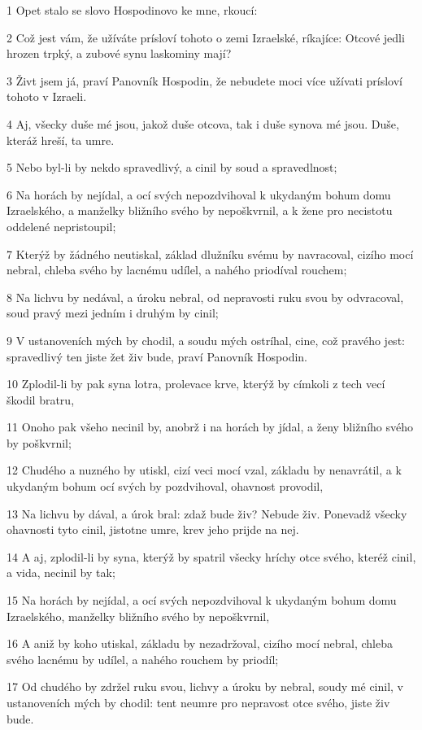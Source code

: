 \par 1 Opet stalo se slovo Hospodinovo ke mne, rkoucí:
\par 2 Což jest vám, že užíváte prísloví tohoto o zemi Izraelské, ríkajíce: Otcové jedli hrozen trpký, a zubové synu laskominy mají?
\par 3 Živt jsem já, praví Panovník Hospodin, že nebudete moci více užívati prísloví tohoto v Izraeli.
\par 4 Aj, všecky duše mé jsou, jakož duše otcova, tak i duše synova mé jsou. Duše, kteráž hreší, ta umre.
\par 5 Nebo byl-li by nekdo spravedlivý, a cinil by soud a spravedlnost;
\par 6 Na horách by nejídal, a ocí svých nepozdvihoval k ukydaným bohum domu Izraelského, a manželky bližního svého by nepoškvrnil, a k žene pro necistotu oddelené nepristoupil;
\par 7 Kterýž by žádného neutiskal, základ dlužníku svému by navracoval, cizího mocí nebral, chleba svého by lacnému udílel, a nahého priodíval rouchem;
\par 8 Na lichvu by nedával, a úroku nebral, od nepravosti ruku svou by odvracoval, soud pravý mezi jedním i druhým by cinil;
\par 9 V ustanoveních mých by chodil, a soudu mých ostríhal, cine, což pravého jest: spravedlivý ten jiste žet živ bude, praví Panovník Hospodin.
\par 10 Zplodil-li by pak syna lotra, prolevace krve, kterýž by címkoli z tech vecí škodil bratru,
\par 11 Onoho pak všeho necinil by, anobrž i na horách by jídal, a ženy bližního svého by poškvrnil;
\par 12 Chudého a nuzného by utiskl, cizí veci mocí vzal, základu by nenavrátil, a k ukydaným bohum ocí svých by pozdvihoval, ohavnost provodil,
\par 13 Na lichvu by dával, a úrok bral: zdaž bude živ? Nebude živ. Ponevadž všecky ohavnosti tyto cinil, jistotne umre, krev jeho prijde na nej.
\par 14 A aj, zplodil-li by syna, kterýž by spatril všecky hríchy otce svého, kteréž cinil, a vida, necinil by tak;
\par 15 Na horách by nejídal, a ocí svých nepozdvihoval k ukydaným bohum domu Izraelského, manželky bližního svého by nepoškvrnil,
\par 16 A aniž by koho utiskal, základu by nezadržoval, cizího mocí nebral, chleba svého lacnému by udílel, a nahého rouchem by priodíl;
\par 17 Od chudého by zdržel ruku svou, lichvy a úroku by nebral, soudy mé cinil, v ustanoveních mých by chodil: tent neumre pro nepravost otce svého, jiste živ bude.
